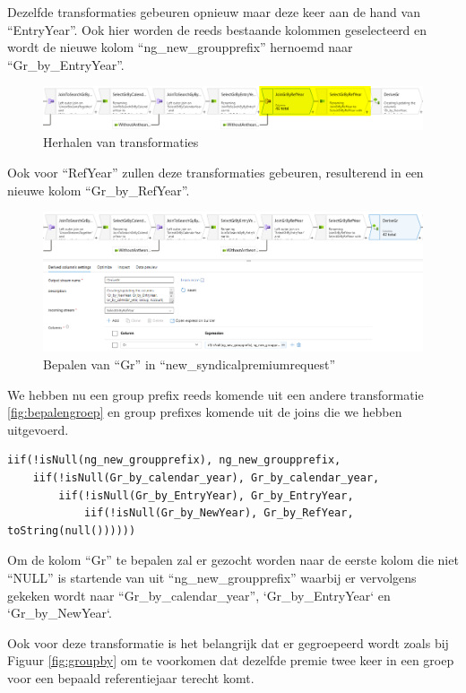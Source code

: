 Dezelfde transformaties gebeuren opnieuw maar deze keer aan de hand van ``EntryYear''. Ook hier worden de reeds bestaande kolommen geselecteerd en wordt de nieuwe kolom ``ng\_new\_groupprefix'' hernoemd naar ``Gr\_by\_EntryYear''.

\begin{figure}[H]
    \centering
    \includegraphics[width=1\textwidth]{./graphics/adf/gr_4.png}
    \caption{Herhalen van transformaties}
\end{figure}

Ook voor ``RefYear'' zullen deze transformaties gebeuren, resulterend in een nieuwe kolom ``Gr\_by\_RefYear''.

\begin{figure}[H]
    \centering
    \includegraphics[width=1\textwidth]{./graphics/adf/gr_5.png}
    \caption{Bepalen van ``Gr'' in ``new\_syndicalpremiumrequest''}
\end{figure}

We hebben nu een group prefix reeds komende uit een andere transformatie \ref{fig:bepalengroep} en group prefixes komende uit de joins die we hebben uitgevoerd.

\begin{verbatim}
iif(!isNull(ng_new_groupprefix), ng_new_groupprefix, 
    iif(!isNull(Gr_by_calendar_year), Gr_by_calendar_year,
        iif(!isNull(Gr_by_EntryYear), Gr_by_EntryYear,
            iif(!isNull(Gr_by_NewYear), Gr_by_RefYear, toString(null())))))
\end{verbatim}

Om de kolom ``Gr'' te bepalen zal er gezocht worden naar de eerste kolom die niet ``NULL'' is startende van uit ``ng\_new\_groupprefix'' waarbij er vervolgens gekeken wordt naar ``Gr\_by\_calendar\_year'', `Gr\_by\_EntryYear` en `Gr\_by\_NewYear`.

Ook voor deze transformatie is het belangrijk dat er gegroepeerd wordt zoals bij Figuur \ref{fig:groupby} om te voorkomen dat dezelfde premie twee keer in een groep voor een bepaald referentiejaar terecht komt.

